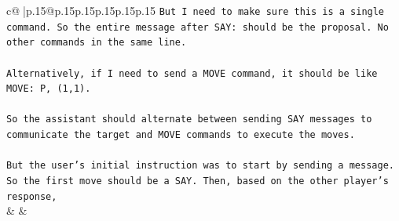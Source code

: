 \documentclass{article}
\begin{document}
{\begin{supertabular}{c@{$\;$}|p{.15\linewidth}@{}p{.15\linewidth}p{.15\linewidth}p{.15\linewidth}p{.15\linewidth}p{.15\linewidth}}
{{{\texttt{But I need to make sure this is a single command. So the entire message after SAY: should be the proposal. No other commands in the same line.} \\
\\ 
\texttt{Alternatively, if I need to send a MOVE command, it should be like MOVE: P, (1,1).} \\
\\ 
\texttt{So the assistant should alternate between sending SAY messages to communicate the target and MOVE commands to execute the moves.} \\
\\ 
\texttt{But the user's initial instruction was to start by sending a message. So the first move should be a SAY. Then, based on the other player's response,} \\
            }
        }
    }
    & & \\ \\


\end{supertabular}}
\end{document}
